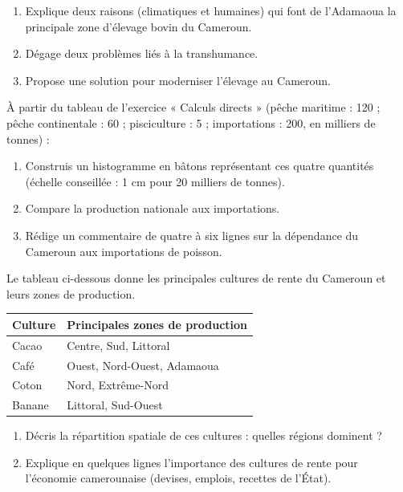 \documentclass[11pt]{article}
\begin{document}
\begin{exercice}
\begin{enumerate}
\item Explique deux raisons (climatiques et humaines) qui font de l'Adamaoua la principale zone d'élevage bovin du Cameroun.
\item Dégage deux problèmes liés à la transhumance.
\item Propose une solution pour moderniser l'élevage au Cameroun.
\end{enumerate}
\end{exercice}

\begin{exercice}
À partir du tableau de l'exercice « Calculs directs » (pêche maritime : 120 ; pêche continentale : 60 ; pisciculture : 5 ; importations : 200, en milliers de tonnes) :
\begin{enumerate}
\item Construis un histogramme en bâtons représentant ces quatre quantités (échelle conseillée : 1 cm pour 20 milliers de tonnes).
\item Compare la production nationale aux importations.
\item Rédige un commentaire de quatre à six lignes sur la dépendance du Cameroun aux importations de poisson.
\end{enumerate}
\end{exercice}

\begin{exercice}
Le tableau ci-dessous donne les principales cultures de rente du Cameroun et leurs zones de production.
\begin{center}
\begin{tabularx}{\linewidth}{|l|X|}
\hline
\rowcolor{popblueL} Culture & Principales zones de production \\
\hline
Cacao & Centre, Sud, Littoral \\
\hline
Café & Ouest, Nord-Ouest, Adamaoua \\
\hline
Coton & Nord, Extrême-Nord \\
\hline
Banane & Littoral, Sud-Ouest \\
\hline
\end{tabularx}
\end{center}
\begin{enumerate}
\item Décris la répartition spatiale de ces cultures : quelles régions dominent ?
\item Explique en quelques lignes l'importance des cultures de rente pour l'économie camerounaise (devises, emplois, recettes de l'État).
\end{enumerate}
\end{exercice}
\end{document}
